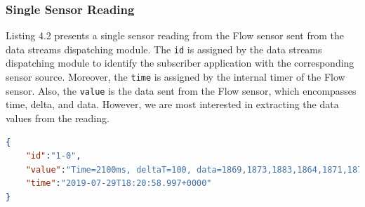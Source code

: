 \subsubsection{Single Sensor Reading}

Listing 4.2 presents a single sensor reading from the Flow sensor sent from the data streams dispatching module. The \verb|id| is assigned by the data streams dispatching module to identify the subscriber application with the corresponding sensor source. Moreover, the \verb|time| is assigned by the internal timer of the Flow sensor. Also, the \verb|value| is the data sent from the Flow sensor, which encompasses time, delta, and data. However, we are most interested in extracting the data values from the reading. 

\begin{lstlisting}[language=json, caption={Encompasses a single sample received from the Flow sensor.}, captionpos=b]
{
    "id":"1-0",
    "value":"Time=2100ms, deltaT=100, data=1869,1873,1883,1864,1871,1870,1870",
    "time":"2019-07-29T18:20:58.997+0000"
}
\end{lstlisting}



